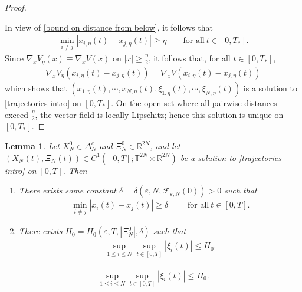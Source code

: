 \documentclass[10pt,a4paper]{amsart}
\newtheorem{lem}{Lemma}
\begin{document}
\begin{proof}
\begin{itemize}
\end{itemize}
In view of \eqref{bound on distance from below}, it follows that 
\begin{align*}
\min_{i\neq j}\left\vert x_{i,\eta}(t)-x_{j,\eta}(t)\right\vert\geq\eta\qquad \mbox{for all}\ t\in [0,T_{\ast}].      
\end{align*}
Since $\nabla_{x}V_{\eta}(x)\equiv\nabla_{x}V(x)$ on $\left\vert x\right\vert \geq \frac{\eta}{2}$, 
it follows that, for all $t\in [0,T_{\ast}]$,
\begin{align*}
\nabla_{x}V_{\eta}(x_{i,\eta}(t)-x_{j,\eta}(t))=\nabla_{x}V(x_{i,\eta}(t)-x_{j,\eta}(t))    
\end{align*}
which shows that 
$(x_{1,\eta}(t),\cdots\!,x_{N,\eta}(t),\xi_{1,\eta}(t),\cdots\!,\xi_{N,\eta}(t))$ is a solution to \eqref{trajectories intro} on $[0,T_{\ast}]$. On the open set where all pairwise distances exceed $\frac{\eta}{2}$, the vector field is locally Lipschitz; hence this solution is unique on $[0,T_*]$.
\end{proof}

\begin{lem}\label{lemma:6.2}
Let $X_{N}^{0}\in  \Delta_{N}^{c}$ and $\Xi_{N}^{0}\in \mathbb{R}^{2N}$, 
and let $(X_{N}(t),\Xi_{N}(t))\in C^{1}([0,T];\mathbb{T}^{2N}\times \mathbb{R}^{2N})$ 
be a solution to \eqref{trajectories intro} on $[0,T]$. Then
\begin{enumerate}
\item[{\rm(i)}] There exists  some constant  
$\delta=\delta(\varepsilon,N,\mathcal{F}_{\varepsilon,N}(0))>0$ such that 
\begin{align}
\min_{i\neq j}\left\vert x_{i}(t)-x_{j}(t)\right\vert\geq \delta 
\qquad\mbox{\ for all} \ t\in [0,T].  \label{bound from below on separation}    
\end{align}
\item[{\rm(ii)}] There exists 
$H_{0}=H_{0}(\varepsilon,T,\left\vert \Xi_{N}^{0}\right\vert,\delta )$ such that
\begin{align}
\underset{1\leq i\leq N}{\sup}\underset{t\in [0,T]}{\sup}\left\vert \xi_{i}(t)\right\vert\leq H_{0}. \label{H0 est} 
\end{align}
\end{enumerate}
\end{lem}

\begin{align}
\underset{1\leq i\leq N}{\sup}\underset{t\in [0,T]}{\sup}\left\vert \xi_{i}(t)\right\vert\leq H_{0}.  
\end{align}
\end{document}

